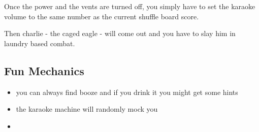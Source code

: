 \documentclass{article}
\begin{document}
Once the power and the vents are turned off, you simply have to set the karaoke volume to the same number as the current shuffle board score.

Then charlie - the caged eagle - will come out and you have to slay him in laundry based combat. 

\subsection*{Fun Mechanics}
\begin{itemize}
\item you can always find booze and if you drink it you might get some hints 
\item the karaoke machine will randomly mock you
\item 
\end{itemize}
\end{document}
